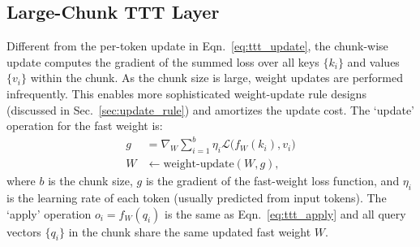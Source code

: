 \subsection{Large-Chunk TTT Layer}
\label{sec:ttt_layer}
Different from the per-token update in Eqn.~\ref{eq:ttt_update}, the chunk-wise update computes the gradient of the summed loss over all keys $\{k_i\}$ and values $\{v_i\}$ within the chunk.
As the chunk size is large, weight updates are performed infrequently. This enables more sophisticated weight-update rule designs (discussed in Sec.~\ref{sec:update_rule}) and amortizes the update cost.
The `update' operation for the fast weight is:
\begin{align}
g &=  \nabla_{W}  \sum_{i=1} ^b \eta_i \mathcal{L}  \big(f_W(k_i), v_i\big) \label{eq:ttt_chunk_gradient} \\
W &\leftarrow \mathrm{weight\mbox{-}update} (W, g),
\label{eq:ttt_chunk_update}
\end{align}
where $b$ is the chunk size, $g$ is the gradient of the fast-weight loss function, 
and $\eta_i$ is the learning rate of each token (usually predicted from input tokens).
The `apply' operation $o_i = f_W(q_i)$ is the same as Eqn.~\ref{eq:ttt_apply} and 
 all query vectors $\{q_i\}$ in the chunk share the same updated fast weight $W$.



